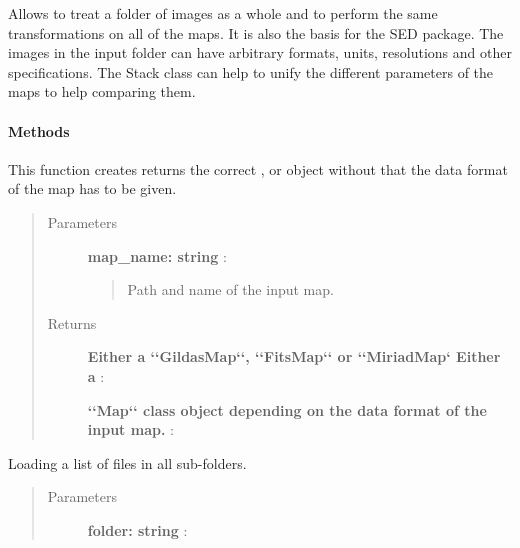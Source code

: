 \documentclass[a4paper,10pt,english]{sphinxmanual}
\begin{document}
\begin{fulllineitems}
\label{maps:astrolyze.maps.stack.Stack}
Allows to treat a folder of images as a whole and to perform the same
transformations on all of the maps. It is also the basis for the SED
package. The images in the input folder can have arbitrary formats, units,
resolutions and other specifications.
The Stack class can help to unify the different parameters of the maps to
help comparing them.
\paragraph{Methods}

\begin{fulllineitems}
\label{maps:astrolyze.maps.stack.Stack.get_map_format}
This function creates returns the correct ,
 or  object without that the data format of the
map has to be given.
\begin{quote}\begin{description}
\item[{Parameters }] \leavevmode
\textbf{map\_name: string} :
\begin{quote}

Path and name of the input map.
\end{quote}

\item[{Returns }] \leavevmode
\textbf{Either a {}`{}`GildasMap{}`{}`, {}`{}`FitsMap{}`{}` or {}`{}`MiriadMap{}` Either a} :

\textbf{{}`{}`Map{}`{}` class object depending on the data format of the input map.} :

\end{description}\end{quote}

\end{fulllineitems}


\begin{fulllineitems}
\label{maps:astrolyze.maps.stack.Stack.get_list}
Loading a list of files in all sub-folders.
\begin{quote}\begin{description}
\item[{Parameters }] \leavevmode
\textbf{folder: string} :
\begin{quote}


\end{quote}
\end{description}
\end{quote}
\end{fulllineitems}
\end{fulllineitems}
\end{document}
